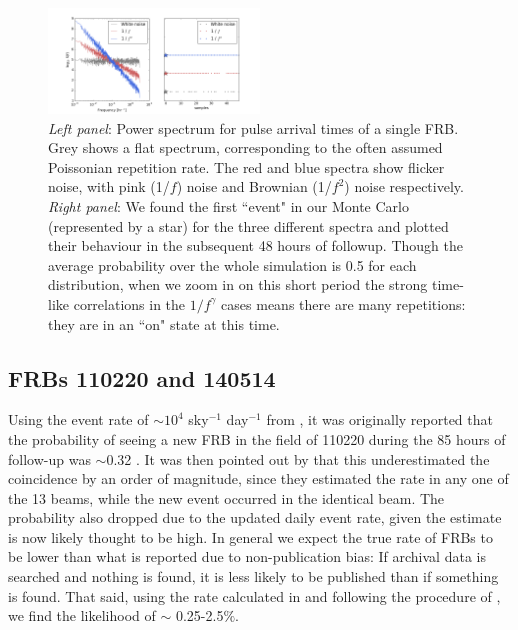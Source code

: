 \documentclass[useAMS,usenatbib]{mn2e}
\begin{document}
\begin{figure}
  \centering
   \includegraphics[trim={.5in, 0in, .5in, 0in}, width=0.5\textwidth, height=0.27\textwidth]{frb_sim_pink24.png}
   \caption{\textit{Left panel}: Power spectrum for pulse arrival times of a single FRB.
   Grey shows a flat spectrum, corresponding to the often assumed Poissonian 
   repetition rate. The red and blue spectra show flicker noise, with pink (1/$f$) 
   noise and Brownian (1/$f^2$) noise respectively. \textit{Right panel}: 
   We found the first ``event" in our Monte Carlo (represented by a star) for the three different spectra 
   and plotted their behaviour in the subsequent 48 hours of followup. Though the average
   probability over the whole simulation is 0.5 for each distribution, when we zoom in 
   on this short period the strong time-like correlations 
   in the $1/f^\gamma$ cases means there are many repetitions: they are in an ``on" state at this time.}
   \label{FIG-RATE}
\end{figure}


\subsection{FRBs 110220 and 140514}
Using the event rate of $\sim10^4$ sky$^{-1}$ day$^{-1}$
from \cite{2013Sci...341...53T}, it 
was originally reported that the probability of seeing a 
new FRB in the field of 110220 during the 85 hours of follow-up 
was $\sim$0.32  
\citep{2015MNRAS.447..246P}. It was then pointed out by \cite{2015arXiv150701002M} 
that this underestimated the coincidence by an order of magnitude, 
since they estimated the rate in any one of the 13 beams, 
while the new event occurred in the identical beam.
The probability also dropped due to the updated daily event rate,
given the \cite{2013Sci...341...53T} estimate is now likely thought to be high.
In general we expect the true rate of FRBs to be lower than what is 
reported due to non-publication bias: If archival data is searched and 
nothing is found, it is less likely to be published than if something is found. 
That said, using the rate calculated in \cite{2015arXiv150500834R} and following
the procedure of \cite{2015arXiv150701002M}, we find the likelihood of 
$\sim$ 0.25-2.5$\%$.
\end{document}
